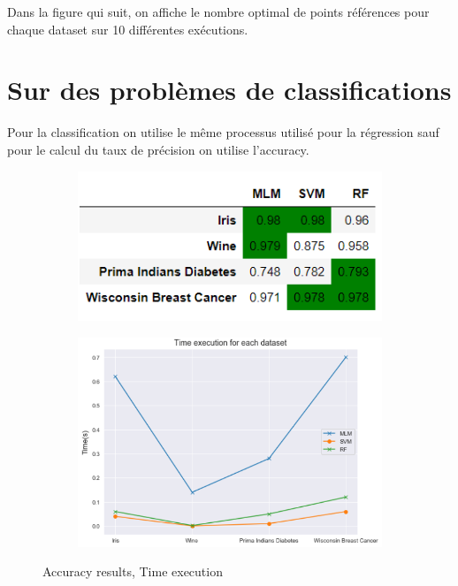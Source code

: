 \documentclass[12pt,a4paper]{report}
\begin{document}
Dans la figure qui suit, on affiche le nombre optimal de points références pour chaque dataset sur 10 différentes exécutions. \\
{\color{MidnightBlue}\section{Sur des problèmes de classifications}}
\par Pour la classification on utilise le même processus utilisé pour la régression sauf pour le calcul du taux de précision on utilise l'accuracy.
\begin{figure}[!h]
    \centering
    \begin{subfigure}[b]{0.4\textwidth}
        \includegraphics[width=\textwidth]{classif1.png}
    \end{subfigure}
    \begin{subfigure}[b]{0.5\textwidth}
        \includegraphics[width=\textwidth]{classif12.png}
    \end{subfigure}
    \caption{Accuracy results, Time execution}
\end{figure}
 
\end{document}
